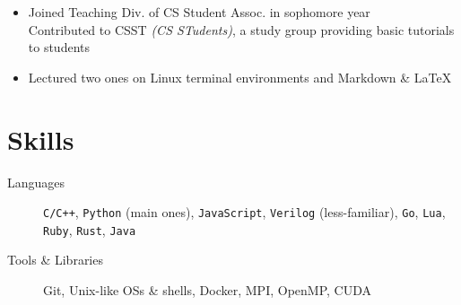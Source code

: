 \documentclass[12pt, a4paper]{article}
\begin{document}
\begin{itemize}
\item Joined Teaching Div. of CS Student Assoc. in sophomore year\\
Contributed to \textsf{CSST} \textit{(CS STudents)}, a study group providing basic tutorials to students
\item Lectured two ones on \textsf{Linux} terminal environments and \textsf{Markdown} \& \LaTeX
\end{itemize}

\section{Skills}

\begin{description}
\item[Languages] \texttt{C/C++}, \texttt{Python} (main ones), \texttt{JavaScript}, \texttt{Verilog} (less-familiar), \texttt{Go}, \texttt{Lua}, \texttt{Ruby}, \texttt{Rust}, \texttt{Java}
\item[Tools \& Libraries] \textsf{Git}, \textsf{Unix}-like OSs \& shells, \textsf{Docker}, \textsf{MPI}, \textsf{OpenMP}, \textsf{CUDA}
\end{description}
\end{document}
